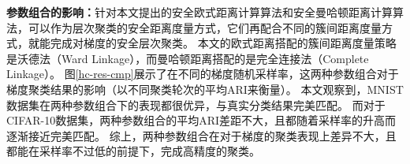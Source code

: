 \textbf{参数组合的影响：}针对本文提出的安全欧式距离计算算法和安全曼哈顿距离计算算法，可以作为层次聚类的安全距离度量方式，它们再配合不同的簇间距离度量方式，就能完成对梯度的安全层次聚类。
本文的欧式距离搭配的簇间距离度量策略是沃德法（Ward Linkage），而曼哈顿距离搭配的是完全连接法（Complete Linkage）。
图\ref{hc-res-cmp}展示了在不同的梯度随机采样率，这两种参数组合对于梯度聚类结果的影响（以不同聚类轮次的平均ARI来衡量）。
本文观察到，MNIST数据集在两种参数组合下的表现都很优异，与真实分类结果完美匹配。
而对于CIFAR-10数据集，两种参数组合的平均ARI差距不大，且都随着采样率的升高而逐渐接近完美匹配。
综上，两种参数组合在对于梯度的聚类表现上差异不大，且都能在采样率不过低的前提下，完成高精度的聚类。

\begin{figure}[htb]
	\centering
	\qquad
\end{figure}
